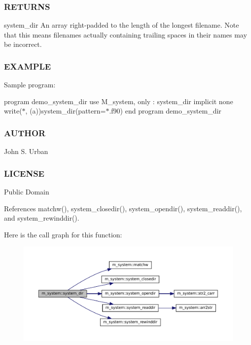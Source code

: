 \subsubsection*{R\+E\+T\+U\+R\+NS}

system\+\_\+dir An array right-\/padded to the length of the longest filename. Note that this means filenames actually containing trailing spaces in their names may be incorrect.

\subsubsection*{E\+X\+A\+M\+P\+LE}

Sample program\+:

program demo\+\_\+system\+\_\+dir use M\+\_\+system, only \+: system\+\_\+dir implicit none write($\ast$, \textquotesingle{}(a)\textquotesingle{})system\+\_\+dir(pattern=\textquotesingle{}$\ast$.f90\textquotesingle{}) end program demo\+\_\+system\+\_\+dir

\subsubsection*{A\+U\+T\+H\+OR}

John S. Urban

\subsubsection*{L\+I\+C\+E\+N\+SE}

Public Domain 

References matchw(), system\+\_\+closedir(), system\+\_\+opendir(), system\+\_\+readdir(), and system\+\_\+rewinddir().

Here is the call graph for this function\+:\nopagebreak
\begin{figure}[H]
\begin{center}
\leavevmode
\includegraphics[width=350pt]{namespacem__system_a744f46033ef5e7ae95ec6cbff3ae3f89_cgraph}
\end{center}
\end{figure}
\mbox{\label{namespacem__system_a5a32db818a9ffb0a4ea724e95356c560}} 
